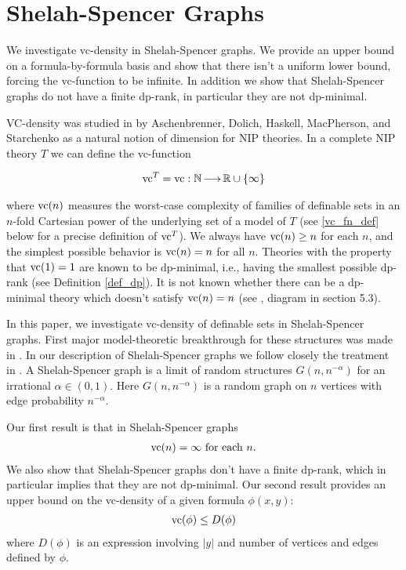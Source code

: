 \chapter{Shelah-Spencer Graphs}



  We investigate vc-density in Shelah-Spencer graphs.
  We provide an upper bound on a formula-by-formula basis and show that there isn't a uniform lower bound,
  forcing the vc-function to be infinite.
  In addition we show that Shelah-Spencer graphs do not have a finite dp-rank,
  in particular they are not dp-minimal.


VC-density was studied in \cite{density} by Aschenbrenner, Dolich, Haskell, MacPherson, and Starchenko as a natural notion of dimension for NIP theories.
In a complete NIP theory $T$ we can define the vc-function

\begin{align*}
  \operatorname{vc}^T = \operatorname{vc} : \mathbb{N} \operatorname{\longrightarrow} \mathbb{R} \cup \left\{\infty\right\}
\end{align*}

where $\operatorname{vc}(n)$ measures the worst-case complexity of families of definable sets in an $n$-fold Cartesian power of the underlying set of a model of $T$
(see \ref{vc_fn_def} below for a precise definition of $\operatorname{vc}^T$).
We always have $\operatorname{vc}(n) \geq n$ for each $n$, and the simplest possible behavior is $\operatorname{vc}(n) = n$ for all $n$. Theories with the property that $\operatorname{vc}(1) = 1$ are known to be dp-minimal, i.e., having the smallest possible dp-rank (see Definition \ref{def_dp}). It is not known whether there can be a dp-minimal theory which doesn't satisfy $\operatorname{vc}(n)=n$
(see \cite{density}, diagram in section 5.3).


In this paper, we investigate vc-density of definable sets in Shelah-Spencer graphs.
First major model-theoretic breakthrough for these structures was made in \cite{spencer}.
In our description of Shelah-Spencer graphs we follow closely the treatment in \cite{laskowski}.
A Shelah-Spencer graph is a limit of random structures $G(n, n^{-\alpha})$ for an irrational $\alpha \in (0,1)$.
Here $G(n, n^{-\alpha})$ is a random graph on $n$ vertices with edge probability $n^{-\alpha}$.

Our first result is that in Shelah-Spencer graphs
\begin{align*}
  \operatorname{vc}(n) = \infty \text{ for each } n.
\end{align*}
We also show that Shelah-Spencer graphs don't have a finite dp-rank, which in particular implies that they are not dp-minimal.
Our second result provides an upper bound on the vc-density of a given formula $\phi(x, y)$:
\begin{align*}
  \operatorname{vc}(\phi) \leq D(\phi)
\end{align*}
where $D(\phi)$ is an expression involving $|y|$ and number of vertices and edges defined by $\phi$.

